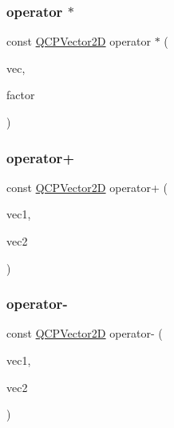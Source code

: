 \mbox{\label{class_q_c_p_vector2_d_a5d2819b8e6c9566f916a2091a2eb07de}} 
\subsubsection{\texorpdfstring{operator $\ast$}{operator *}\hspace{0.1cm}{\footnotesize\ttfamily [2/2]}}
{\footnotesize\ttfamily const \mbox{\hyperlink{class_q_c_p_vector2_d}{Q\+C\+P\+Vector2D}} operator $\ast$ (\begin{DoxyParamCaption}\item[{const \mbox{\hyperlink{class_q_c_p_vector2_d}{Q\+C\+P\+Vector2D}} \&}]{vec,  }\item[{double}]{factor }\end{DoxyParamCaption})\hspace{0.3cm}{\ttfamily [friend]}}

\mbox{\label{class_q_c_p_vector2_d_a24cc5985429b12dbed4d0d3c5a917d20}} 
\subsubsection{\texorpdfstring{operator+}{operator+}}
{\footnotesize\ttfamily const \mbox{\hyperlink{class_q_c_p_vector2_d}{Q\+C\+P\+Vector2D}} operator+ (\begin{DoxyParamCaption}\item[{const \mbox{\hyperlink{class_q_c_p_vector2_d}{Q\+C\+P\+Vector2D}} \&}]{vec1,  }\item[{const \mbox{\hyperlink{class_q_c_p_vector2_d}{Q\+C\+P\+Vector2D}} \&}]{vec2 }\end{DoxyParamCaption})\hspace{0.3cm}{\ttfamily [friend]}}

\mbox{\label{class_q_c_p_vector2_d_a9e01331d8debf0877ee4cba9abd83605}} 
\subsubsection{\texorpdfstring{operator-\/}{operator-}\hspace{0.1cm}{\footnotesize\ttfamily [1/2]}}
{\footnotesize\ttfamily const \mbox{\hyperlink{class_q_c_p_vector2_d}{Q\+C\+P\+Vector2D}} operator-\/ (\begin{DoxyParamCaption}\item[{const \mbox{\hyperlink{class_q_c_p_vector2_d}{Q\+C\+P\+Vector2D}} \&}]{vec1,  }\item[{const \mbox{\hyperlink{class_q_c_p_vector2_d}{Q\+C\+P\+Vector2D}} \&}]{vec2 }\end{DoxyParamCaption})\hspace{0.3cm}{\ttfamily [friend]}}

